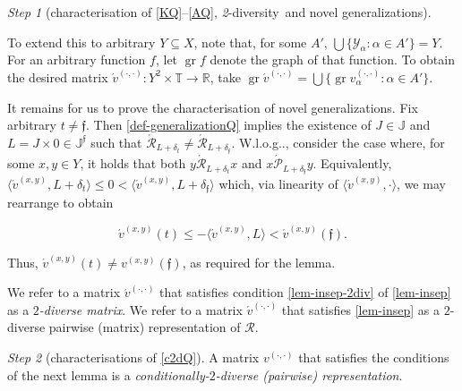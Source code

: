 \documentclass[ecta,nameyear,draft]{econsocart}
\makeatletter
\newcommand{\R}{\mathbb R}
\newcommand{\mc}{\mathcal}
\newcommand{\novel}{\mathfrak f}
\newcommand{\ext}{\mathrel{\mc R}}
\newcommand{\aext}{\mathrel{\acute{\mathrel{\mathcal R}}}}
\newcommand{\asext}{\mathrel{\acute{\mathrel{\mathcal P}}}}
\newcommand{\aextb}{\mathbin{\acute{\mathbin{\mathcal R}}}}
\newcommand{\mbbt}{{\mathds {T}}}
\newcommand{\mbbj}{\mathds J}
\newcommand{\mbbjp}{{\mathds {J}^{\novel}}}
\newcommand{\xy}{{(x, y)}}
\newcommand{\dd}{{(\cdot,\cdot)}}
\newcommand{\twodiv}{\textit{2}-\textup{diversity}}
\DeclareMathOperator{\graph}{gr}
\newcommand\Wlog{W\@.l\@.o\@.g\@ifnextchar.{}{.\@}}
\theoremstyle{plain}
\theoremstyle{remark}
\newtheorem{step}{Step}[section]
\makeatother
\begin{document}
\begin{appendix}
\begin{step}[characterisation of \ref{KQ}–\ref{AQ}, \twodiv\ and novel
      generalizations]
\begin{proofEnd}
      To extend this to arbitrary $Y \subseteq X$, note that, for some $A'$,
      $\bigcup\{\mc Y_\alpha : \alpha \in A' \} = Y$. For an arbitrary function
      $f$, let $\graph f$ denote the graph of that function. To obtain the
      desired matrix $\acute{v}^{\dd}: Y^2 \times \mbbt \rightarrow \R$, take
      $\graph \acute{v}^{\dd} = \bigcup \{\graph v^{\dd}_{\alpha} : \alpha \in
      A'\}$.
    
      It remains for us to prove the characterisation of novel
      generalizations. Fix arbitrary $t \neq \novel$.  Then
      \cref{def-generalizationQ} implies the existence of $J \in \mbbj$ and $L
      = J \times 0 \in \mbbjp$ such that $\aextb _ {L + \delta_{t}} \neq \aextb
      _ {L + \delta_{\novel}}$.  \Wlog, consider the case where, for some $x ,
      y \in Y$, it holds that both $y \aext _ {L + \delta _ t} x$ and $x \asext
      _ {L + \delta_ \novel} y $. Equivalently, $\langle \acute{v}^{\xy}, L +
      \delta_ t \rangle \leq 0 < \langle \acute{v}^{\xy}, L + \delta_
      \novel\rangle$ which, via linearity of $\langle \acute{v}^{\xy}, \cdot
      \rangle$, we may rearrange to obtain
      \begin{linenomath*}
        \begin{equation}\label{eq-nov} \acute{v}^{\xy} ( t ) \leq -\langle
          \acute{v}^{\xy}, L \rangle <
          \acute{v}^\xy ( \novel ) .
        \end{equation}
      \end{linenomath*}
      Thus, $\acute{v}^{\xy} (t) \neq v^{\xy}(\novel)$, as required for the
      lemma.
    \end{proofEnd}
    We refer to a matrix $\acute{v}^{\dd}$ that satisfies condition
    \ref{lem-insep-2div} of \cref{lem-insep} as a \emph{$2$-diverse matrix}. We
    refer to a matrix $\acute{v}^{\dd}$ that satisfies \cref{lem-insep} as a
    $2$-diverse pairwise (matrix) representation of $\ext$.
  \end{step}
  \begin{step}[characterisations of \ref{c2dQ}]\label{step-condtwodiv} A matrix
    $v^{\dd}$ that satisfies the conditions of the next lemma is a
    \emph{conditionally-$2$-diverse (pairwise) representation}.
  

\end{step}
\end{appendix}
\end{document}
